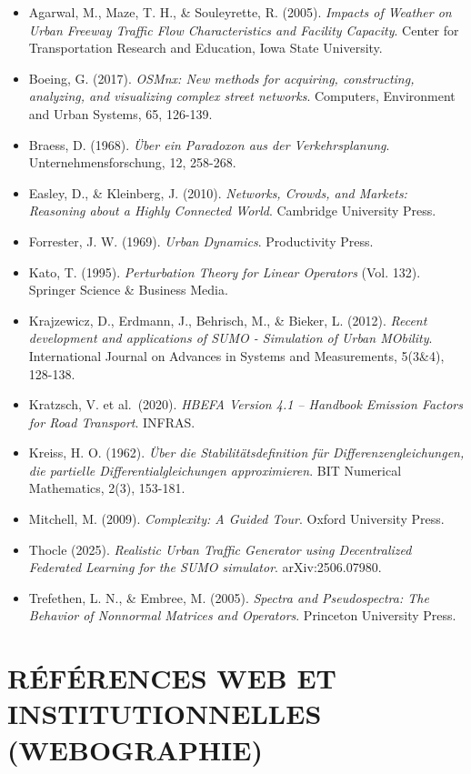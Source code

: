 \documentclass[10pt, a4paper]{article}
\providecommand{\tightlist}{}
\begin{document}
\begin{itemize}
\tightlist
\item
  Agarwal, M., Maze, T. H., \& Souleyrette, R. (2005). \emph{Impacts of
  Weather on Urban Freeway Traffic Flow Characteristics and Facility
  Capacity}. Center for Transportation Research and Education, Iowa
  State University.
\item
  Boeing, G. (2017). \emph{OSMnx: New methods for acquiring,
  constructing, analyzing, and visualizing complex street networks}.
  Computers, Environment and Urban Systems, 65, 126-139.
\item
  Braess, D. (1968). \emph{Über ein Paradoxon aus der Verkehrsplanung}.
  Unternehmensforschung, 12, 258-268.
\item
  Easley, D., \& Kleinberg, J. (2010). \emph{Networks, Crowds, and
  Markets: Reasoning about a Highly Connected World}. Cambridge
  University Press.
\item
  Forrester, J. W. (1969). \emph{Urban Dynamics}. Productivity Press.
\item
  Kato, T. (1995). \emph{Perturbation Theory for Linear Operators} (Vol.
  132). Springer Science \& Business Media.
\item
  Krajzewicz, D., Erdmann, J., Behrisch, M., \& Bieker, L. (2012).
  \emph{Recent development and applications of SUMO - Simulation of
  Urban MObility}. International Journal on Advances in Systems and
  Measurements, 5(3\&4), 128-138.
\item
  Kratzsch, V. et al.~(2020). \emph{HBEFA Version 4.1 -- Handbook
  Emission Factors for Road Transport}. INFRAS.
\item
  Kreiss, H. O. (1962). \emph{Über die Stabilitätsdefinition für
  Differenzengleichungen, die partielle Differentialgleichungen
  approximieren}. BIT Numerical Mathematics, 2(3), 153-181.
\item
  Mitchell, M. (2009). \emph{Complexity: A Guided Tour}. Oxford
  University Press.
\item
  Thocle (2025). \emph{Realistic Urban Traffic Generator using
  Decentralized Federated Learning for the SUMO simulator}.
  arXiv:2506.07980.
\item
  Trefethen, L. N., \& Embree, M. (2005). \emph{Spectra and
  Pseudospectra: The Behavior of Nonnormal Matrices and Operators}.
  Princeton University Press.
\end{itemize}

\newpage

\section{RÉFÉRENCES WEB ET INSTITUTIONNELLES
(WEBOGRAPHIE)}\label{ruxe9fuxe9rences-web-et-institutionnelles-webographie}
\end{document}
